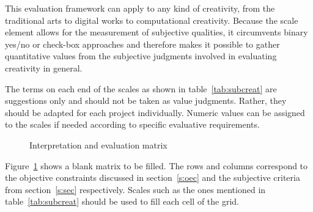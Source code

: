 This evaluation framework can apply to any kind of creativity, from the traditional arts to digital works to computational creativity. Because the scale element allows for the measurement of subjective qualities, it circumvents binary yes/no or check-box approaches and therefore makes it possible to gather quantitative values from the subjective judgments involved in evaluating creativity in general.

The terms on each end of the scales as shown in table~\ref{tab:subcreat} are suggestions only and should not be taken as value judgments. Rather, they should be adapted for each project individually. Numeric values can be assigned to the scales if needed according to specific evaluative requirements.


\begin{figure}[!htbp] %
  \centering
\caption[Interpretation and evaluation matrix]{Interpretation and evaluation matrix}
\label{fig:matrix}
\end{figure}

Figure~\ref{fig:matrix} shows a blank matrix to be filled. The rows and columns correspond to the objective constraints discussed in section~\ref{s:oec} and the subjective criteria from section~\ref{s:sec} respectively. Scales such as the ones mentioned in table~\ref{tab:subcreat} should be used to fill each cell of the grid. 

